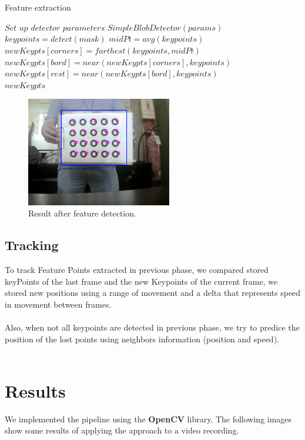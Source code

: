 \documentclass[journal]{IEEEtran}
\begin{document}
\\
\\
\begin{algorithm}
\caption{Feature extraction}
\begin{algorithmic}[1]
\State $\textit{Set up detector parameters}$
\State $\textit{SimpleBlobDetector}(params)$
\State $keypoints   = \textit{detect}(mask)$ 
\State $midPt   = \textit{avg}(keypoints)$
\State $newKeypts[corners] = farthest(keypoints, midPt)$
\State $newKeypts[bord] = near(newKeypts[corners], keypoints)$
\State $newKeypts[rest] = near(newKeypts[bord], keypoints)$\\
\Return $newKeypts$
\end{algorithmic}
\end{algorithm}

\begin{figure}[H]
\centering
\includegraphics[width=2.5in]{_img/img_report2_feature_detection.png}
\caption{Result after feature detection.}
\end{figure}

\subsection{Tracking}
To track Feature Points extracted in previous phase, we compared stored keyPoints of the last frame and the new Keypoints of the current frame, we stored new positions using a range of movement and a delta that represents speed in movement between frames.
\\
\\
Also, when not all keypoints are detected in previous phase, we try to predice the position of the lost points using neighbors information (position and speed).
\\
\\
\section{Results}
We implemented the pipeline using the \textbf{OpenCV} library. The following images show some results of applying the approach to a video recording.
\end{document}
